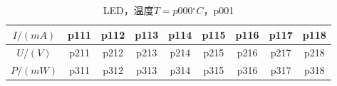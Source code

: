 \newpage
\begin{table}[H]
    \centering
    \begin{tabular}{|c|c|c|c|c|c|c|c|c|}
        \hline
        $I/(\si{mA})$ & p111 & p112 & p113 & p114 & p115 & p116 & p117 & p118 \\\hline
        $U / (\si{V})$  & p211 & p212 & p213 & p214 & p215 & p216 & p217 & p218 \\\hline
        $P / (\si{mW})$ & p311 & p312 & p313 & p314 & p315 & p316 & p317 & p318 \\\hline
    \end{tabular}
    \caption{LED，温度$T=p000{}^{\circ}C$，p001}
\end{table}
